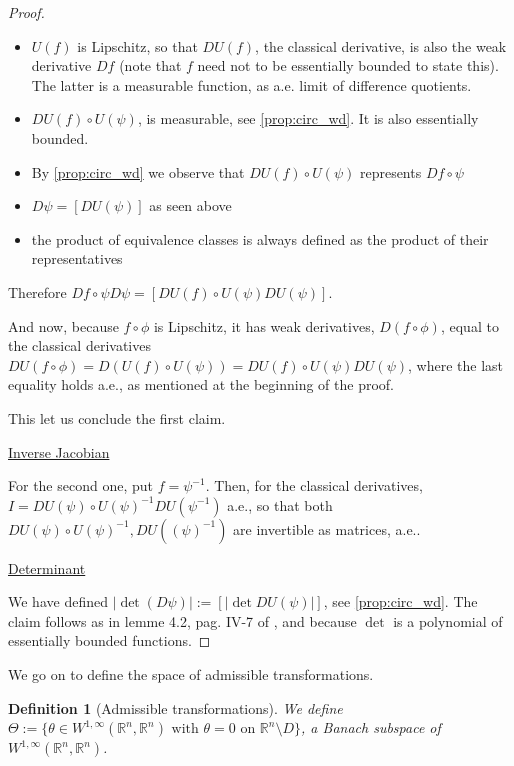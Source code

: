 \documentclass[english,a4paper,9pt,oneside]{scrbook}	%
\theoremstyle{break}
\newtheorem{defn}[equation]{Definition}
\newenvironment{mproof}[1][\proofname]{%
  \begin{proof}[#1]$ $\par\nobreak\ignorespaces
}{%
  \end{proof}
}
\renewcommand*{\proofname}{Proof}
\theoremstyle{remark}
\newcommand{\mR}{\mathbb{R}}
\begin{document}
\begin{appendices}
\begin{mproof}
\begin{itemize}
	\item $U(f)$ is Lipschitz, so that $DU(f)$, the classical derivative, is also the weak derivative $Df$ (note that $f$ need not to be essentially bounded to state this). The latter is a measurable function, as a.e. limit of difference quotients.
	\item $DU(f)\circ U(\psi)$, is measurable, see \cref{prop:circ_wd}. It is also essentially bounded.
	\item By \cref{prop:circ_wd} we observe that $DU(f)\circ U(\psi)$ represents $Df \circ \psi$
	\item $D\psi = [DU(\psi)]$ as seen above
	\item the product of equivalence classes is always defined as the product of their representatives
\end{itemize}

Therefore $ Df \circ \psi D\psi = [DU(f)\circ U(\psi) DU(\psi)]$.

And now, because $f \circ \phi$ is Lipschitz, it has weak derivatives, $D(f \circ \phi)$, equal to the classical derivatives $DU(f\circ \phi) = D (U(f)\circ U(\psi)) = DU(f)\circ U(\psi) DU(\psi)$, where the last equality holds a.e., as mentioned at the beginning of the proof.

This let us conclude the first claim.

\underline{Inverse Jacobian}

For the second one, put $f = \psi^{-1}$. Then, for the classical derivatives, $I = DU(\psi)\circ U(\psi)^{-1} DU(\psi^{-1})$ a.e., so that both $DU(\psi)\circ U(\psi)^{-1}, DU((\psi)^{-1})$ are invertible as matrices, a.e.. 

\underline{Determinant}

We have defined $|\det(D\psi)|:=[|\det DU(\psi)|]$, see \cref{prop:circ_wd}. The claim follows as in lemme 4.2, pag. IV-7 of \cite{murat}, and because $\det$ is a polynomial of essentially bounded functions.

\end{mproof}

We go on to define the space of admissible transformations.

\begin{defn}[Admissible transformations]
\label{def:adm}
We define $\Theta:=\{\theta \in W^{1,\infty}(\mR^n,\mR^n) \text{ with } \theta=0 \text{ on } \mR^n \setminus D\}$, a Banach subspace of $ W^{1,\infty}(\mR^n,\mR^n)$.



\end{defn}
\end{appendices}
\end{document}
